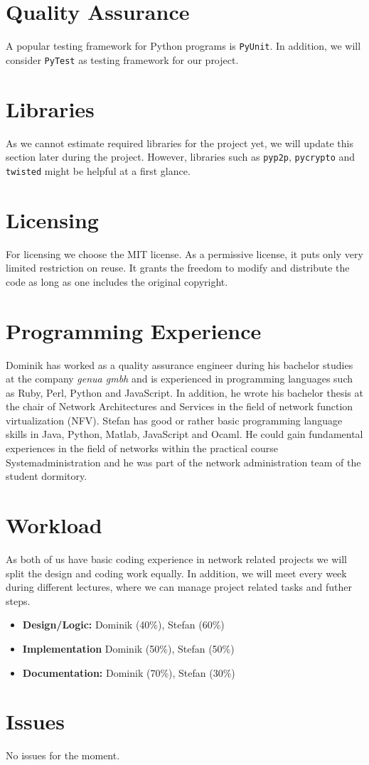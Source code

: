 \documentclass[IN,11pt,twoside,openright,english]{article}
\begin{document}
\section{Quality Assurance}

A popular testing framework for Python programs is \texttt{PyUnit}. In addition, we will consider \texttt{PyTest} as testing framework for our project.

\section{Libraries}

As we cannot estimate required libraries for the project yet, we will update this section later during the project. However, libraries such as \texttt{pyp2p}, \texttt{pycrypto} and \texttt{twisted} might be helpful at a first glance.

\section{Licensing}

For licensing we choose the MIT license. As a permissive license, it puts only very limited restriction on reuse. It grants the freedom to modify and distribute the code as long as one includes the original copyright.

\section{Programming Experience}

Dominik has worked as a quality assurance engineer during his bachelor studies at the company \textit{genua gmbh} and is experienced in programming languages such as Ruby, Perl, Python and JavaScript. In addition, he wrote his bachelor thesis at the chair of Network Architectures and Services in the field of network function virtualization (NFV).\newline
\newline
Stefan has good or rather basic programming language skills in Java, Python, Matlab, JavaScript and Ocaml. He could gain fundamental experiences in the field of networks within the practical course Systemadministration and he was part of the network administration team of the student dormitory.
\section{Workload}
As both of us have basic coding experience in network related projects we will split the design and coding work equally. In addition, we will meet every week during different lectures, where we can manage project related tasks and futher steps.
\begin{itemize}
\item \textbf{Design/Logic:} Dominik (40\%), Stefan (60\%)
\item \textbf{Implementation} Dominik (50\%), Stefan (50\%)
\item \textbf{Documentation:} Dominik (70\%), Stefan (30\%)
\end{itemize}


\section{Issues}

No issues for the moment.
\end{document}
